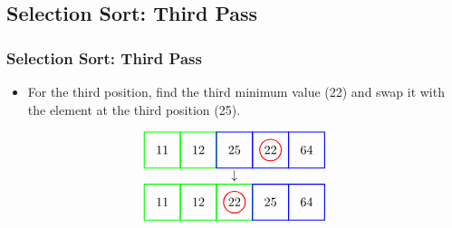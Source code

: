 \documentclass{beamer}
\begin{document}
\subsection{Selection Sort: Third Pass}
\begin{frame}[c, fragile]
\frametitle{Selection Sort: Third Pass}

\begin{itemize}
    \item For the third position, find the third minimum value (22) and swap it with the element at the third position (25).
\end{itemize}

\[
\begin{array}{c}
\begin{tikzpicture}[baseline=(current bounding box.center)]
    \node at (0,0) {11};
    \node at (1,0) {12};
    \node at (2,0) {25};
    \node at (3,0) {22};
    \node at (4,0) {64};
    \draw[red, thick] (3,0) circle (0.3);
    \draw[green, thick] (-0.5,-0.5) rectangle (0.5,0.5);
    \draw[green, thick] (0.5,-0.5) rectangle (1.5,0.5);
    \draw[blue, thick] (1.5,-0.5) rectangle (2.5,0.5);
    \draw[blue, thick] (2.5,-0.5) rectangle (3.5,0.5);
    \draw[blue, thick] (3.5,-0.5) rectangle (4.5,0.5);
\end{tikzpicture} \\
\downarrow \\
\begin{tikzpicture}[baseline=(current bounding box.center)]
    \node at (0,0) {11};
    \node at (1,0) {12};
    \node at (2,0) {22};
    \node at (3,0) {25};
    \node at (4,0) {64};
    \draw[red, thick] (2,0) circle (0.3);
    \draw[green, thick] (-0.5,-0.5) rectangle (0.5,0.5);
    \draw[green, thick] (0.5,-0.5) rectangle (1.5,0.5);
    \draw[green, thick] (1.5,-0.5) rectangle (2.5,0.5);
    \draw[blue, thick] (2.5,-0.5) rectangle (3.5,0.5);
    \draw[blue, thick] (3.5,-0.5) rectangle (4.5,0.5);
\end{tikzpicture} 
\end{array}
\]

\end{frame}
\end{document}
